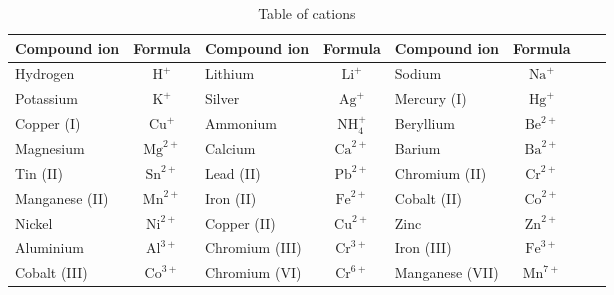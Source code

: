 \begin{enumerate}[noitemsep, label=\textbf{\arabic*}. ]
      
\begin{table}[H]
\begin{center}
\label{tab:cations}
\begin{tabular}{|l|c|l|c|l|c|l|c|} \hline
\textbf{Compound ion} & \textbf{Formula} & \textbf{Compound ion} & \textbf{Formula} & \textbf{Compound ion} & \textbf{Formula}  \\ \hline
Hydrogen       & $\text{H}^{+}$   & Lithium        & $\text{Li}^{+}$     & Sodium          & $\text{Na}^{+}$  \\ \hline
Potassium      & $\text{K}^{+}$   & Silver         & $\text{Ag}^{+}$     & Mercury (I)     & $\text{Hg}^{+}$  \\ \hline
Copper (I)     & $\text{Cu}^{+}$  & Ammonium       & $\text{NH}_{4}^{+}$ & Beryllium       & $\text{Be}^{2+}$ \\ \hline
Magnesium      & $\text{Mg}^{2+}$ & Calcium        & $\text{Ca}^{2+}$    & Barium          & $\text{Ba}^{2+}$ \\ \hline
Tin (II)       & $\text{Sn}^{2+}$ & Lead (II)      & $\text{Pb}^{2+}$    & Chromium (II)   & $\text{Cr}^{2+}$ \\ \hline
Manganese (II) & $\text{Mn}^{2+}$ & Iron (II)      & $\text{Fe}^{2+}$    & Cobalt (II)     & $\text{Co}^{2+}$ \\ \hline
Nickel         & $\text{Ni}^{2+}$ & Copper (II)    & $\text{Cu}^{2+}$    & Zinc            & $\text{Zn}^{2+}$ \\ \hline
Aluminium      & $\text{Al}^{3+}$ & Chromium (III) & $\text{Cr}^{3+}$    & Iron (III)      & $\text{Fe}^{3+}$ \\ \hline
Cobalt (III)   & $\text{Co}^{3+}$  & Chromium (VI)  & $\text{Cr}^{6+}$    & Manganese (VII) & $\text{Mn}^{7+}$ \\ \hline

\end{tabular}

 \end{center}
\caption{Table of cations}
\label{tab:cations}
\end{table}


\end{enumerate}
